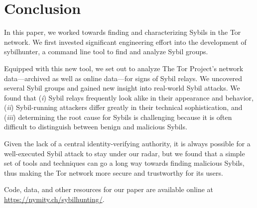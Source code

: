 \section{Conclusion}
\label{sec:conclusion}
In this paper, we worked towards finding and characterizing Sybils in the Tor
network.  We first invested significant engineering effort into the development
of sybilhunter, a command line tool to find and analyze Sybil groups.

Equipped with this new tool, we set out to analyze The Tor Project's network
data---archived as well as online data---for signs of Sybil relays.  We
uncovered several Sybil groups and gained new insight into real-world Sybil
attacks.  We found that (\emph{i}) Sybil relays frequently look alike in their
appearance and behavior, (\emph{ii}) Sybil-running attackers differ greatly in
their technical sophistication, and (\emph{iii}) determining the root cause for
Sybils is challenging because it is often difficult to distinguish between
benign and malicious Sybils.

Given the lack of a central identity-verifying authority, it is always possible
for a well-executed Sybil attack to stay under our radar, but we found that a
simple set of tools and techniques can go a long way towards finding malicious
Sybils, thus making the Tor network more secure and trustworthy for its users.

Code, data, and other resources for our paper are available online at
\url{https://nymity.ch/sybilhunting/}.
